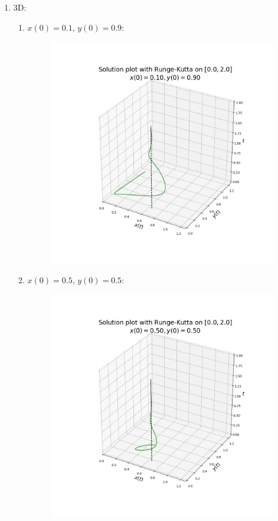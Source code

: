 \begin{enumerate}
\begin{enumerate}
\begin{figure}
		\end{figure}
	\end{enumerate}
	\item 3D:
	\begin{enumerate}
		\item $x(0) = 0.1$, $y(0) = 0.9$:
		\begin{figure}
			\centering
			\includegraphics[width=\textwidth]{plot_3d_0.10_0.90_2.png}
		\end{figure}
		\item $x(0) = 0.5$, $y(0) = 0.5$:
		\begin{figure}
			\centering
			\includegraphics[width=\textwidth]{plot_3d_0.50_0.50_2.png}

\end{figure}
\end{enumerate}
\end{enumerate}
